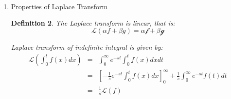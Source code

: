 \documentclass{article}
\newtheorem{definition}{Definition}[section]
\begin{document}
\begin{enumerate}
\begin{definition}
              The inverse Laplace transform needs knowledge of complex analysis,
              which is not covered in this note.
          \end{definition}
    \item Properties of Laplace Transform
          \begin{definition}
              The Laplace transform is linear, that is:
              \begin{equation}
                  \mathcal{L}(\alpha f + \beta g) =
                  \alpha \mathcal{f} + \beta \mathcal{g}
              \end{equation}

              Laplace transform of indefinite integral is given by:
              \begin{eqnarray}
                  \mathcal{L}(\int_{0}^{t}f(x) dx) &=&
                  \int_{0}^{\infty} e^{-st} \int_{0}^{t} f(x) dx dt \\
                  &=& \left[-\frac{1}{s}e^{-st} \int_{0}^{t} f(x) dx \right]_{0}^{\infty}
                  + \frac{1}{s} \int_{0}^{\infty} e^{-st} f(t) dt \\
                  &=& \frac{1}{s} \mathcal{L}(f)
              \end{eqnarray}
          \end{definition}
\end{enumerate}
\end{document}
